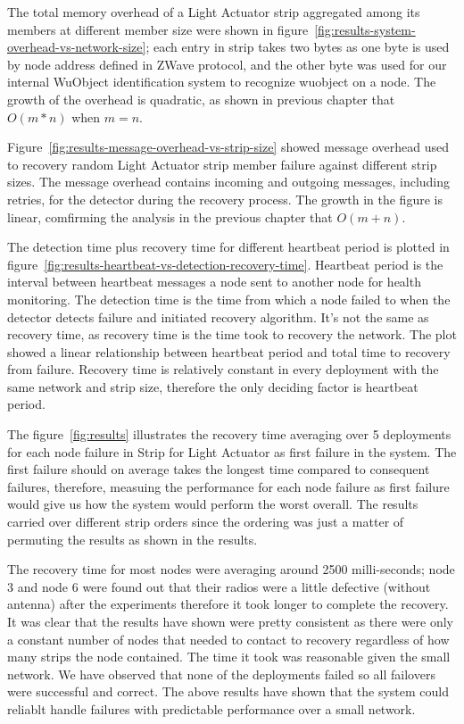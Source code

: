 The total memory overhead of a Light Actuator strip aggregated among its members
at different member size were shown in
figure~\ref{fig:results-system-overhead-vs-network-size}; each entry in strip
takes two bytes as one byte is used by node address defined in ZWave protocol,
and the other byte was used for our internal WuObject identification system to
recognize wuobject on a node. The growth of the overhead is quadratic, as shown
in previous chapter that $O(m*n)$ when $m = n$. 

Figure~\ref{fig:results-message-overhead-vs-strip-size} showed message overhead
used to recovery random Light Actuator strip member failure against different
strip sizes. The message overhead contains incoming and outgoing messages,
including retries, for the detector during the recovery process. The growth in
the figure is linear, comfirming the analysis in the previous chapter that $O(m+n)$.

The detection time plus recovery time for different heartbeat period is plotted
in figure~\ref{fig:results-heartbeat-vs-detection-recovery-time}. Heartbeat
period is the interval between heartbeat messages a node sent to
another node for health monitoring. The detection time is the time from 
which a node failed to when the detector detects failure and initiated recovery
algorithm. It's not the same as recovery time, as recovery time is the time took
to recovery the network. The plot showed a linear relationship between heartbeat
period and total time to recovery from failure. Recovery time is relatively
constant in every deployment with the same network and strip size, therefore the
only deciding factor is heartbeat period. 

The figure~\ref{fig:results} illustrates the recovery time averaging over
5 deployments for each node failure in Strip for Light Actuator as first failure
in the system. The first failure should on average takes the longest time
compared to consequent failures, therefore, measuing the performance for each
node failure as first failure would give us how the system would perform the
worst overall. The results carried over different strip orders since the
ordering was just a matter of permuting the results as shown in the results.

The recovery time for most nodes were averaging around 2500 milli-seconds; node
3 and node 6 were found out that their radios were a little defective (without
antenna) after the experiments therefore it took longer to complete the
recovery. It was clear that the results have shown were pretty consistent as
there were only a constant number of nodes that needed to contact to recovery
regardless of how many strips the node contained. The time it took was
reasonable given the small network. We have observed that none of the
deployments failed so all failovers were successful and correct. The above
results have shown that the system could reliablt handle failures with
predictable performance over a small network.



